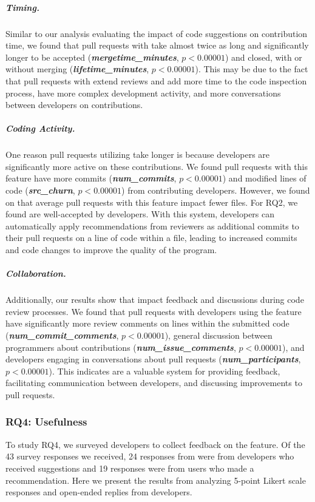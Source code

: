 \subparagraph{Timing.} Similar to our analysis evaluating the impact of code suggestions on contribution time, we found that pull requests with \suggs take almost twice as long and significantly longer to be accepted (\textbf{\em mergetime\_minutes}, $p < 0.00001$) and closed, with or without merging (\textbf{\em lifetime\_minutes}, $p < 0.00001$). This may be due to the fact that pull requests with \sugg extend reviews and add more time to the code inspection process, have more complex development activity, and more conversations between developers on contributions. 

\subparagraph{Coding Activity.} One reason pull requests utilizing \sugg take longer is because developers are significantly more active on these contributions. We found pull requests with this feature have more commits (\textbf{\em num\_commits}, $p < 0.00001$) and modified lines of code (\textbf{\em src\_churn}, $p < 0.00001$) from contributing developers. However, we found on that average pull requests with this feature impact fewer files. For RQ2, we found \sugg are well-accepted by developers. With this system, developers can automatically apply recommendations from reviewers as additional commits to their pull requests on a line of code within a file, leading to increased commits and code changes to improve the quality of the program.

\subparagraph{Collaboration.} Additionally, our results show that \suggs impact feedback and discussions during code review processes. We found that pull requests with developers using the \sugg feature have significantly more review comments on lines within the submitted code (\textbf{\textit{num\_commit\_comments}}, $p < 0.00001$), general discussion between programmers about contributions (\textbf{\em num\_issue\_comments}, $p < 0.00001$), and developers engaging in conversations about pull requests (\textbf{\em num\_participants}, $p < 0.00001$). This indicates \sugg are a valuable system for providing feedback, facilitating communication between developers, and discussing improvements to pull requests.




\subsubsection{RQ4: Usefulness}

To study RQ4, we surveyed developers to collect feedback on the \suggs feature. Of the 43 survey responses we received, 24 responses from were from developers who received suggestions and 19 responses were from users who made a recommendation. Here we present the results from analyzing 5-point Likert scale responses and open-ended replies from developers.

